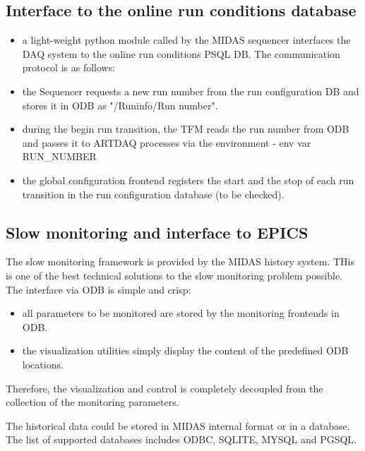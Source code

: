 \subsection{Interface to the online run conditions database} 

\begin{itemize}
\item
  a light-weight python module \cite{DAQ_2025_FRONTENDS} called by the MIDAS sequencer
  interfaces the DAQ system to the online run conditions PSQL DB.
  The communication protocol is as follows:
\item
  the Sequencer requests  a new run number from the run configuration DB
  and stores it in ODB as  {\blue"/Runinfo/Run number"}.
\item
  during the begin run transition, the TFM reads the run number from ODB
  and passes it to ARTDAQ processes via the environment - env var {\blue RUN\_NUMBER}
\item
  the global configuration frontend registers the start and the stop of each
  run transition in the run configuration database (to be checked).
\end{itemize}


\subsection{Slow monitoring and interface to EPICS}

The slow monitoring framework is provided by the MIDAS history system.
THis is one of the best technical solutions to the slow monitoring problem possible.
The interface via ODB is simple and crisp:
\begin{itemize}
\item
  all parameters to be monitored are stored by the monitoring frontends in ODB.
\item
  the visualization utilities simply display the content of the predefined ODB locations.
\end{itemize}

Therefore, the visualization and control is completely decoupled from the collection of the
monitoring parameters.

The historical data could be stored in  MIDAS internal format or in a database.
The list of supported databases includes ODBC, SQLITE, MYSQL and PGSQL.

